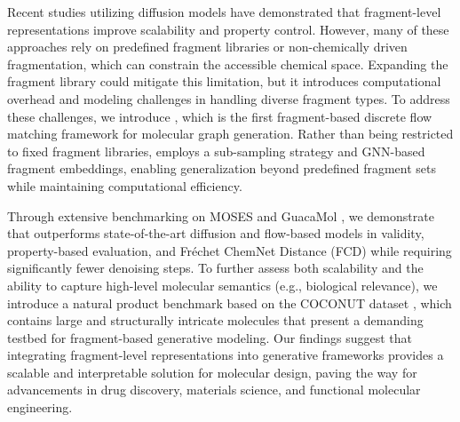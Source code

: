 Recent studies \citep{fragment_based_diffusion, orgmol_design} utilizing diffusion models have demonstrated that fragment-level representations improve scalability and property control. 
However, many of these approaches rely on predefined fragment libraries or non-chemically driven fragmentation, which can constrain the accessible chemical space. 
Expanding the fragment library could mitigate this limitation, but it introduces computational overhead and modeling challenges in handling diverse fragment types.
To address these challenges, we introduce \methodname{}, which is the first fragment-based discrete flow matching framework for molecular graph generation.
Rather than being restricted to fixed fragment libraries, \methodname{} employs a sub-sampling strategy and GNN-based fragment embeddings, enabling generalization beyond predefined fragment sets while maintaining computational efficiency.

Through extensive benchmarking on MOSES and GuacaMol \citep{moses,guacamol}, we demonstrate that \methodname{} outperforms state-of-the-art diffusion and flow-based models in validity, property-based evaluation, and Fréchet ChemNet Distance (FCD) while requiring significantly fewer denoising steps. 
To further assess both scalability and the ability to capture high-level molecular semantics (e.g., biological relevance), we introduce a natural product benchmark based on the COCONUT dataset \citep{coconut, coconut2}, which contains large and structurally intricate molecules that present a demanding testbed for fragment-based generative modeling.
Our findings suggest that integrating fragment-level representations into generative frameworks provides a scalable and interpretable solution for molecular design, paving the way for advancements in drug discovery, materials science, and functional molecular engineering.